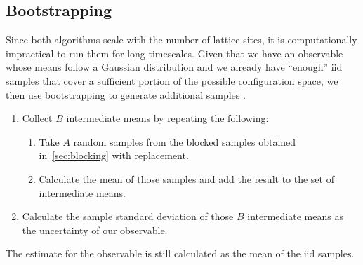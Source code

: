 	\subsection{Bootstrapping}\label{sec:bootstrap}
		Since both algorithms scale with the number of lattice sites, it is computationally impractical to run them for long timescales. Given that we have an observable whose means follow a Gaussian distribution and we already have \enquote{enough} iid samples that cover a sufficient portion of the possible configuration space, we then use bootstrapping to generate additional samples \citep*{bootstrap}.
		\begin{enumerate}
			\item Collect $B$ intermediate means by repeating the following:
			\begin{enumerate}
				\item Take $A$ random samples from the blocked samples obtained in~\cref{sec:blocking} with replacement.
				\item Calculate the mean of those samples and add the result to the set of intermediate means.
			\end{enumerate}
			\item Calculate the sample standard deviation of those $B$ intermediate means as the uncertainty of our observable.
		\end{enumerate}
		The estimate for the observable is still calculated as the mean of the iid samples.